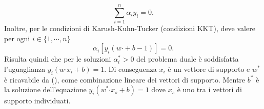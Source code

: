 \documentclass [11pt,a4paper,twoside,openright] {book}
\begin{document}
\begin{equation}
\sum_{i=1}^n \alpha_i y_i = 0.
\end{equation}
Inoltre, per le condizioni di Karush-Kuhn-Tucker\cite{kuhn1951proceedings} (condizioni KKT), deve valere per ogni $i \in \lbrace 1, \cdots, n \rbrace$ 
\begin{equation}
\alpha_i[y_i(w \boldsymbol{\cdot} + b -1)] = 0.
\end{equation}
Risulta quindi che per le soluzioni $\alpha_i^* > 0$ del problema duale è soddisfatta l'uguaglianza $y_i(w \boldsymbol{\cdot} x_i + b) = 1$. Di conseguenza $x_i$ è un vettore di supporto e $w^*$ è ricavabile da (), come combinazione lineare dei vettori di supporto. Mentre $b^*$ è la soluzione dell'equazione $y_i(w^* \boldsymbol{\cdot} x_s + b)= 1$ dove $x_s$ è uno tra i vettori di supporto individuati.
\end{document}
